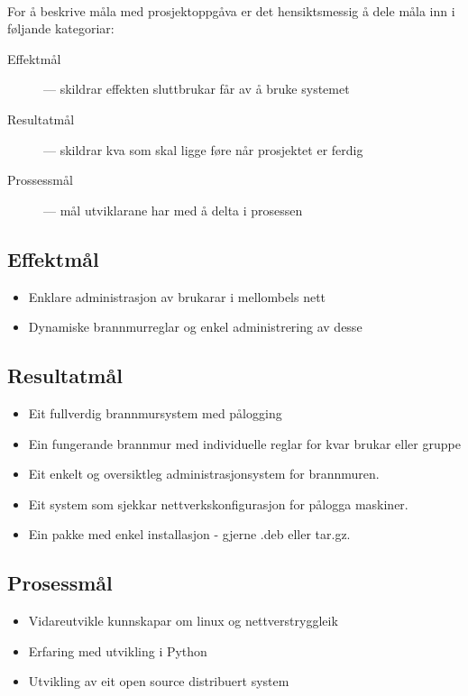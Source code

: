 \documentclass[nynorsk,12pt,a4paper]{article}
\begin{document}
\paragraph{}
For å beskrive måla med prosjektoppgåva er det hensiktsmessig å dele måla inn i føljande kategoriar:
\begin{description}
	\item[Effektmål] --- skildrar effekten sluttbrukar får av å bruke systemet
	\item[Resultatmål] --- skildrar kva som skal ligge føre når prosjektet er ferdig
	\item[Prossessmål] --- mål utviklarane har med å delta i prosessen
\end{description}

\subsection{Effektmål}
\begin{itemize}
	\item Enklare administrasjon av brukarar i mellombels nett
	\item Dynamiske brannmurreglar og enkel administrering av desse
\end{itemize}

\subsection{Resultatmål}
\begin{itemize}
	\item Eit fullverdig brannmursystem med pålogging
	\item Ein fungerande brannmur med individuelle reglar for kvar brukar eller gruppe
	\item Eit enkelt og oversiktleg administrasjonsystem for brannmuren.
	\item Eit system som sjekkar nettverkskonfigurasjon for pålogga maskiner.
	\item Ein pakke med enkel installasjon - gjerne .deb eller tar.gz.
\end{itemize}

\subsection{Prosessmål}
\begin{itemize}
	\item Vidareutvikle kunnskapar om linux og nettverstryggleik
	\item Erfaring med utvikling i Python
	\item Utvikling av eit open source distribuert system
\end{itemize}
\end{document}
